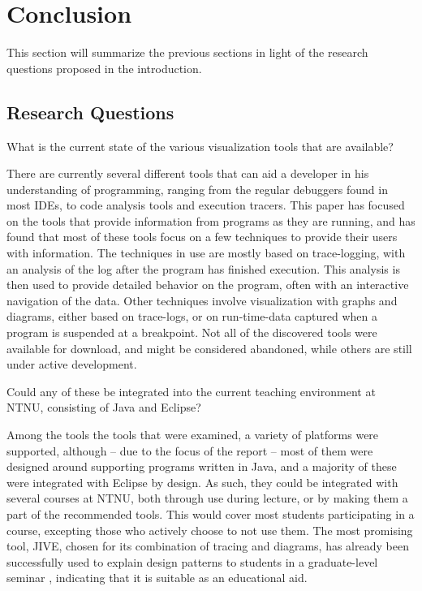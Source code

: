 \chapter{Conclusion}\label{conclusion}
This section will summarize the previous sections in light of the research questions proposed in the introduction.
\section{Research Questions}\label{conclusionRQs}


\begin{theorem}
What is the current state of the various visualization tools that are available?
\end{theorem}

There are currently several different tools that can aid a developer in his understanding of programming, ranging from the regular debuggers found in most IDEs, to code analysis tools and execution tracers.
This paper has focused on the tools that provide information from programs as they are running, and has found that most of these tools focus on a few techniques to provide their users with information.
The techniques in use are mostly based on trace-logging, with an analysis of the log after the program has finished execution.
This analysis is then used to provide detailed behavior on the program, often with an interactive navigation of the data.
Other techniques involve visualization with graphs and diagrams, either based on trace-logs, or on run-time-data captured when a program is suspended at a breakpoint.
Not all of the discovered tools were available for download, and might be considered abandoned, while others are still under active development.
~\\

\begin{theorem}
Could any of these be integrated into the current teaching environment at NTNU, consisting of Java and Eclipse?
\end{theorem}

Among the tools the tools that were examined, a variety of platforms were supported, although -- due to the focus of the report -- most of them were designed around supporting programs written in Java, and a majority of these were integrated with Eclipse by design.
As such, they could be integrated with several courses at NTNU, both through use during lecture, or by making them a part of the recommended tools.
This would cover most students participating in a course, excepting those who actively choose to not use them.
The most promising tool, JIVE, chosen for its combination of tracing and diagrams, has already been successfully used to explain design patterns to students in a graduate-level seminar \cite[p. 99]{Gestwicki2005}, indicating that it is suitable as an educational aid.
~\\

